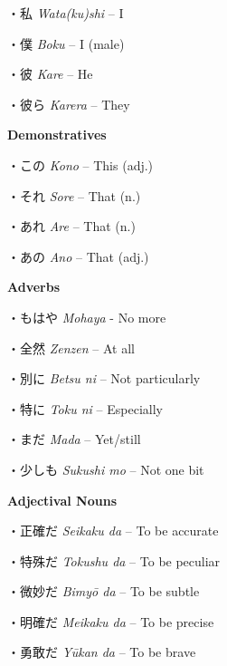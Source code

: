 \par{・私 \emph{Wata(ku)shi }– I }
 
\par{・僕 \emph{Boku }– I (male) }
 
\par{・彼 \emph{Kare }– He }
 
\par{・彼ら \emph{Karera }– They }
 
\par{\textbf{Demonstratives }}
 
\par{・この \emph{Kono }– This (adj.) }
 
\par{・それ \emph{Sore }– That (n.) }
 
\par{・あれ \emph{Are }– That (n.) }
 
\par{・あの \emph{Ano }– That (adj.) }
 
\par{\textbf{Adverbs }}
 
\par{・もはや \emph{Mohaya }- No more }
 
\par{・全然 \emph{Zenzen }– At all }
 
\par{・別に \emph{Betsu ni }– Not particularly }
 
\par{・特に \emph{Toku ni }– Especially }
 
\par{・まだ \emph{Mada }– Yet\slash still }
 
\par{・少しも \emph{Sukushi mo }– Not one bit }

\par{\textbf{Adjectival Nouns } }

\par{・正確だ  \emph{Seikaku da } – To be accurate }

\par{・特殊だ \emph{Tokushu da }– To be peculiar }

\par{・微妙だ \emph{Bimyō da }– To be subtle }

\par{・明確だ \emph{Meikaku da }– To be precise }

\par{・勇敢だ \emph{Yūkan da }– To be brave }

